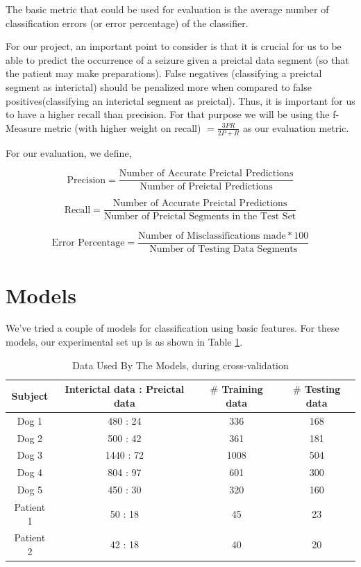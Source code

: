\documentclass[a4paper]{article}
\begin{document}
The basic metric that could be used for evaluation is the average number of classification errors (or error percentage) of the classifier.

For our project, an important point to consider is that it is crucial for us to be able to predict the occurrence of a seizure given a preictal data segment (so that the patient may make preparations). False negatives (classifying a preictal segment as interictal) should be penalized more when compared to false positives(classifying an interictal segment as preictal). Thus, it is important for us to have a higher recall than precision. For that purpose we will be using the f-Measure metric (with higher weight on recall) $ = \frac{3PR}{2P + R} $ as our evaluation metric.

For our evaluation, we define,

$$\text{Precision} = \frac{\text{Number of Accurate Preictal Predictions}}{\text{Number of Preictal Predictions}}$$

$$\text{Recall} = \frac{\text{Number of Accurate Preictal Predictions}}{\text{Number of Preictal Segments in the Test Set}}$$

$$\text{Error Percentage} = \frac{\text{Number of Misclassifications made} * 100}{\text{Number of Testing Data Segments}}$$

\section{Models}
We've tried a couple of models for classification using basic features. For these models, our experimental set up is as shown in Table \ref{tab:data}.

\begin{table}[!htbp]
\centering
\begin{tabular}{*4c}
\toprule
Subject & Interictal data : Preictal data & $\#$ Training data & $\#$ Testing data\\
\midrule
Dog 1 & 480 : 24 & 336 & 168\\
Dog 2 & 500 : 42 & 361 & 181\\
Dog 3 & 1440 : 72 & 1008 & 504\\
Dog 4 & 804 : 97 & 601 & 300\\
Dog 5 & 450 : 30 & 320 & 160\\
Patient 1 & 50 : 18 & 45 & 23\\
Patient 2 & 42 : 18 & 40 & 20\\
\bottomrule
\end{tabular}
\caption{Data Used By The Models, during cross-validation}
\label{tab:data}
\end{table}
\end{document}
